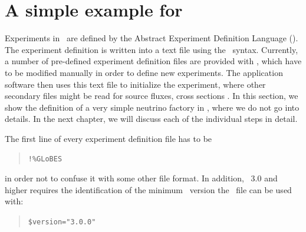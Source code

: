 \section{A simple example for \AEDL }

Experiments in \GLOBES\ are defined by the Abstract Experiment Definition Language (\AEDL ). The experiment definition is written into a text file using the \AEDL\ syntax. Currently, a number of pre-defined experiment definition files are provided with \GLOBES , which have to be modified manually in order to define new experiments.  The application software then uses this text file to initialize the experiment, where other secondary files might be read for source fluxes, cross sections \etc . In this section, we show the definition of a very simple neutrino factory in \AEDL , where we do not go into details. In the next chapter, we will discuss each of the individual steps in detail.

The first line of every experiment definition file has to be
\begin{quote}
{\tt !\%GLoBES}
\end{quote}
in order not to confuse it with some other file format.
In addition, \GLOBES\ 3.0 and higher requires the identification of the
minimum \GLOBES\ version the \AEDL\ file can be used with:
\begin{quote}
{\tt \$version="3.0.0"}
\end{quote}

